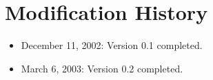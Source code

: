 \documentclass[11pt]{article}
\begin{document}
\section{Modification History}

\begin{itemize}

  \item December 11, 2002: Version 0.1 completed.

  \item March 6, 2003: Version 0.2 completed.

\end{itemize}





\end{document}
